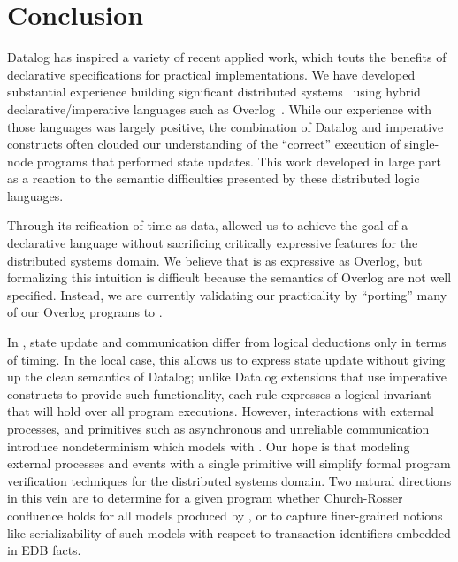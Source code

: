 \section{Conclusion}



Datalog has inspired a variety of recent applied work, which touts the benefits of declarative specifications for practical implementations.  
We have developed substantial experience building significant
distributed systems~\cite{boom-eurosys,Alvaro2009I-Do-Declare:-C,Chu:2007,Loo2009-CACM} using hybrid
declarative/imperative languages such as Overlog~\cite{Loo2009-CACM}.
While our experience with those languages was largely positive, the 
combination of Datalog and imperative constructs 
often clouded  our understanding of the
``correct'' execution of single-node programs that performed state
updates.  
This work developed in large part as a reaction to the semantic difficulties
presented by these distributed logic languages.  

Through its reification of time as data, \lang allowed us to 
achieve the goal of a declarative language without sacrificing critically expressive features for the distributed systems domain.
We believe that \lang is as expressive as Overlog, but formalizing this intuition is difficult because the semantics of Overlog are not well specified.  Instead, we are currently validating our practicality by ``porting'' many of our Overlog programs to \lang.



In \lang, state update and communication differ from logical
deductions only in terms of timing.
In the local case, this allows us to express state update without giving up the clean semantics of Datalog; unlike
Datalog extensions that use imperative constructs to provide such
functionality, each \lang rule expresses a logical invariant that will
hold over all program executions.  
However, interactions with external processes, and primitives such as
asynchronous and unreliable communication introduce nondeterminism
which \lang models with .  
Our hope is that modeling external processes and events with a single
primitive will simplify formal program verification techniques for the distributed systems domain.  Two natural directions in this vein are to determine for a given \lang program whether Church-Rosser confluence holds for all models produced by , or to capture finer-grained notions like serializability of such models with respect to transaction identifiers embedded in EDB facts.  




